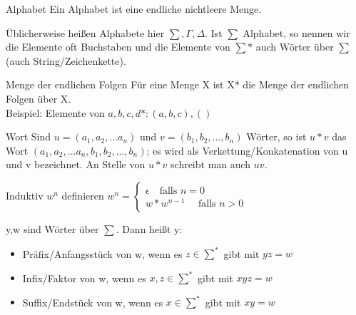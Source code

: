 \documentclass[avery5371]{flashcards}
\begin{document}

\begin{flashcard}[Definition]{Alphabet}
Ein Alphabet ist eine endliche nichtleere Menge.

Üblicherweise heißen Alphabete hier $\sum, \Gamma, \Delta$. Ist $\sum$ Alphabet, so nennen wir die Elemente oft Buchstaben und die Elemente von $\sum*$ auch Wörter über $\sum$ (auch String/Zeichenkette).
\end{flashcard}

\begin{flashcard}[Definition]{Menge der endlichen Folgen}
    Für eine Menge X ist X* die Menge der endlichen Folgen über X.\\

    Beispiel: Elemente von ${a,b,c,d}*:(a,b,c),()$
\end{flashcard}

\begin{flashcard}[Definition]{Wort}
Sind $u=(a_1, a_2, ...a_n)$ und $v=(b_1, b_2,...,b_n)$ Wörter, so ist $u*v$ das Wort $(a_1,a_2,...a_n,b_1,b_2,...,b_n)$; es wird als Verkettung/Konkatenation von u und v bezeichnet.
An Stelle von $u*v$ schreibt man auch $uv$.
\end{flashcard}

\begin{flashcard}[Definition]{Induktiv $w^n$ definieren}
$w^n = \begin{cases} \epsilon \quad\text{falls } n=0 \\ {w * w^{n-1}} \quad\text{ falls } n>0 \end{cases}$
\end{flashcard}

\begin{flashcard}[Definition]{y,w sind Wörter über $\sum$. Dann heißt y:}
\begin{itemize}
    \item Präfix/Anfangsstück von w, wenn es $z\in\sum^*$ gibt mit $yz=w$
    \item Infix/Faktor von w, wenn es $x,z\in\sum^*$ gibt mit $xyz = w$
    \item Suffix/Endstück von w, wenn es $x\in\sum^*$ gibt mit $xy=w$
\end{itemize}    
\end{flashcard}
\end{document}
